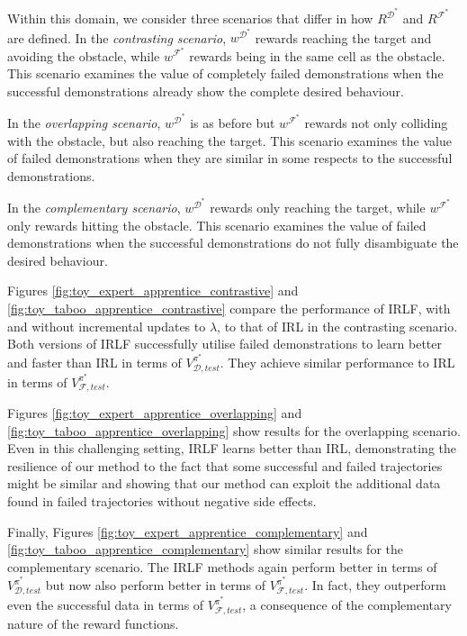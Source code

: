\documentclass[a4paper,11pt]{report}
\begin{document}
Within this domain, we consider three scenarios that differ in how $R^{\mathcal{D}^*}$ and $R^{\mathcal{F}^*}$ are defined.  In the \emph{contrasting scenario}, $w^{\mathcal{D}^*}$ rewards reaching the target and avoiding the obstacle, while $w^{\mathcal{F}^*}$ rewards being in the same cell as the obstacle.  This scenario examines the value of completely failed demonstrations when the successful demonstrations already show the complete desired behaviour. 

In the \emph{overlapping scenario}, $w^{\mathcal{D}^*}$ is as before but $w^{\mathcal{F}^*}$ rewards not only colliding with the obstacle, but also reaching the target. This scenario examines the value of failed demonstrations when they are similar in some respects to the successful demonstrations. 

In the \emph{complementary scenario}, $w^{\mathcal{D}^*}$ rewards only reaching the target, while $w^{\mathcal{F}^*}$ only rewards hitting the obstacle. This scenario examines the value of failed demonstrations when the successful demonstrations do not fully disambiguate the desired behaviour.

Figures \ref{fig:toy_expert_apprentice_contrastive} and \ref{fig:toy_taboo_apprentice_contrastive} compare the performance of IRLF, with and without incremental updates to $\lambda$, to that of IRL in the contrasting scenario. Both versions of IRLF successfully utilise failed demonstrations to learn better and faster than IRL in terms of $V^{\pi^*}_{\mathcal{D},test}$.  They achieve similar performance to IRL in terms of $V^{\pi^*}_{\mathcal{F},test}$.  

Figures \ref{fig:toy_expert_apprentice_overlapping} and \ref{fig:toy_taboo_apprentice_overlapping} show results for the overlapping scenario. Even in this challenging setting, IRLF learns better than IRL, demonstrating the resilience of our method to the fact that some successful and failed trajectories might be similar and showing that our method can exploit the additional data found in failed trajectories without negative side effects. 

Finally, Figures \ref{fig:toy_expert_apprentice_complementary} and \ref{fig:toy_taboo_apprentice_complementary} show similar results for the complementary scenario.  The IRLF methods again perform better in terms of $V^{\pi^*}_{\mathcal{D},test}$ but now also perform better in terms of $V^{\pi^*}_{\mathcal{F},test}$.  In fact, they outperform even the successful data in terms of $V^{\pi^*}_{\mathcal{F},test}$, a consequence of the complementary nature of the reward functions. 
\end{document}
